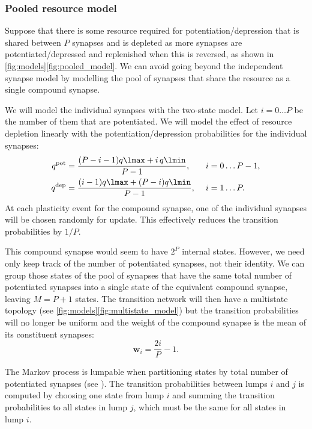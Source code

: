 \documentclass[10pt]{article}
\newcommand{\w}{\mathbf{w}}
\newcommand{\pot}{^{\text{pot}}}
\newcommand{\dep}{^{\text{dep}}}
\begin{document}
\subsubsection{Pooled resource model}\label{sec:pooledmodel}

Suppose that there is some resource required for potentiation/depression that is shared between $P$ synapses and is depleted as more synapses are potentiated/depressed and replenished when this is reversed, as shown in \autoref{fig:models}\ref{fig:pooled_model}.
We can avoid going beyond the independent synapse model by modelling the pool of synapses that share the resource as a single compound synapse.

We will model the individual synapses with the two-state model.
Let $i=0\ldots P$ be the number of them that are potentiated.
We will model the effect of resource depletion linearly with the potentiation/depression probabilities for the individual synapses:
%
\begin{equation}\label{eq:depletion}
  \begin{aligned}
    q\pot &= \frac{(P-i-1)q\lmax + i\,q\lmin}{P-1}, \quad& i &= 0 \ldots P-1,\\
    q\dep &= \frac{(i-1)q\lmax + (P-i)q\lmin}{P-1}, & i &= 1 \ldots P.
  \end{aligned}
\end{equation}
%
At each plasticity event for the compound synapse, one of the individual synapses will be chosen randomly for update.
This effectively reduces the transition probabilities by $1/P$.

This compound synapse would seem to have $2^P$ internal states.
However, we need only keep track of the number of potentiated synapses, not their identity.
We can group those states of the pool of synapses that have the same total number of potentiated synapses into a single state of the equivalent compound synapse, leaving $M=P+1$ states.
The transition network will then have a multistate topology (see \autoref{fig:models}\ref{fig:multistate_model}) but the transition probabilities will no longer be uniform and the weight of the compound synapse is the mean of its constituent synapses:
%
\begin{equation}\label{eq:pooledweight}
  \w_i = \frac{2i}{P}-1.
\end{equation}
%


The Markov process is lumpable when partitioning states by total number of potentiated synapses (see \cite{kemeny1960finite,burke1958markovian,Ball1993Lumpability}).
The transition probabilities between lumps $i$ and $j$ is computed by choosing one state from lump $i$ and summing the transition probabilities to all states in lump $j$,
which must be the same for all states in lump $i$.
\end{document}
